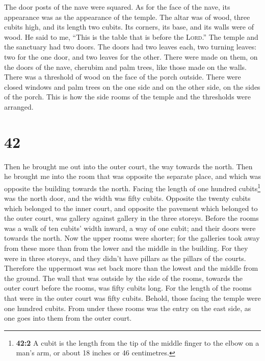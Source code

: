  The door posts of the nave were squared. As for the face
of the nave, its appearance was as the appearance of the temple.
 The altar was of wood, three cubits high, and its length
two cubits. Its corners, its base, and its walls were of wood. He said
to me, ``This is the table that is before the \textsc{Lord}.''
 The temple and the sanctuary had two doors.
 The doors had two leaves each, two turning leaves: two
for the one door, and two leaves for the other.  There
were made on them, on the doors of the nave, cherubim and palm trees,
like those made on the walls. There was a threshold of wood on the face
of the porch outside.  There were closed windows and palm
trees on the one side and on the other side, on the sides of the porch.
This is how the side rooms of the temple and the thresholds were
arranged.

\hypertarget{section-41}{%
\section{42}\label{section-41}}

 Then he brought me out into the outer court, the way
towards the north. Then he brought me into the room that was opposite
the separate place, and which was opposite the building towards the
north.  Facing the length of one hundred cubits\footnote{\textbf{42:2}
  A cubit is the length from the tip of the middle finger to the elbow
  on a man's arm, or about 18 inches or 46 centimetres.} was the north
door, and the width was fifty cubits.  Opposite the twenty
cubits which belonged to the inner court, and opposite the pavement
which belonged to the outer court, was gallery against gallery in the
three storeys.  Before the rooms was a walk of ten cubits'
width inward, a way of one cubit; and their doors were towards the
north.  Now the upper rooms were shorter; for the
galleries took away from these more than from the lower and the middle
in the building.  For they were in three storeys, and they
didn't have pillars as the pillars of the courts. Therefore the
uppermost was set back more than the lowest and the middle from the
ground.  The wall that was outside by the side of the
rooms, towards the outer court before the rooms, was fifty cubits long.
 For the length of the rooms that were in the outer court
was fifty cubits. Behold, those facing the temple were one hundred
cubits.  From under these rooms was the entry on the east
side, as one goes into them from the outer court.

